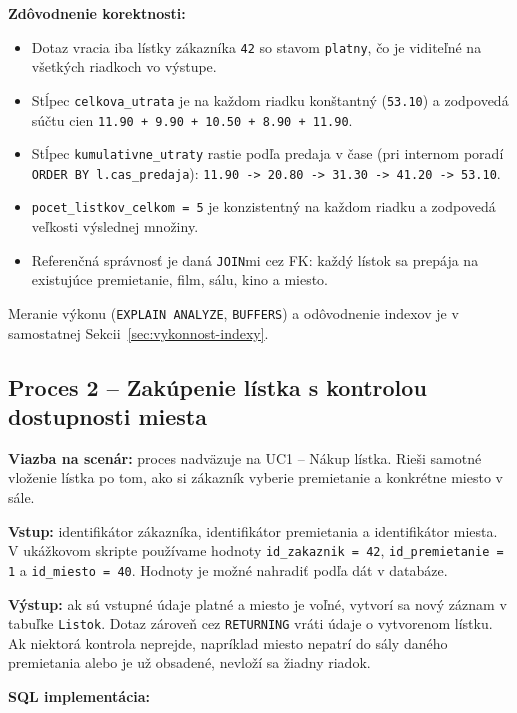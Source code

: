 \documentclass[11pt, a4paper]{article}
\begin{document}
\textbf{Zdôvodnenie korektnosti:}
\begin{itemize}
    \item Dotaz vracia iba lístky zákazníka \texttt{42} so stavom \texttt{platny}, čo je viditeľné na všetkých riadkoch vo výstupe.
    \item Stĺpec \texttt{celkova\_utrata} je na každom riadku konštantný (\texttt{53.10}) a zodpovedá súčtu cien \texttt{11.90 + 9.90 + 10.50 + 8.90 + 11.90}.
    \item Stĺpec \texttt{kumulativne\_utraty} rastie podľa predaja v čase (pri internom poradí \texttt{ORDER BY l.cas\_predaja}): \texttt{11.90 -> 20.80 -> 31.30 -> 41.20 -> 53.10}.
    \item \texttt{pocet\_listkov\_celkom = 5} je konzistentný na každom riadku a zodpovedá veľkosti výslednej množiny.
    \item Referenčná správnosť je daná \texttt{JOIN}mi cez FK: každý lístok sa prepája na existujúce premietanie, film, sálu, kino a miesto.
\end{itemize}

Meranie výkonu (\texttt{EXPLAIN ANALYZE}, \texttt{BUFFERS}) a odôvodnenie indexov je v samostatnej Sekcii~\ref{sec:vykonnost-indexy}.

\subsection{Proces 2 -- Zakúpenie lístka s kontrolou dostupnosti miesta}

\textbf{Viazba na scenár:} proces nadväzuje na UC1 -- Nákup lístka. Rieši samotné vloženie lístka po tom, ako si zákazník vyberie premietanie a konkrétne miesto v sále.

\textbf{Vstup:} identifikátor zákazníka, identifikátor premietania a identifikátor miesta. V ukážkovom skripte používame hodnoty \texttt{id\_zakaznik = 42}, \texttt{id\_premietanie = 1} a \texttt{id\_miesto = 40}. Hodnoty je možné nahradiť podľa dát v databáze.

\textbf{Výstup:} ak sú vstupné údaje platné a miesto je voľné, vytvorí sa nový záznam v tabuľke \texttt{Listok}. Dotaz zároveň cez \texttt{RETURNING} vráti údaje o vytvorenom lístku. Ak niektorá kontrola neprejde, napríklad miesto nepatrí do sály daného premietania alebo je už obsadené, nevloží sa žiadny riadok.

\textbf{SQL implementácia:}
\end{document}
